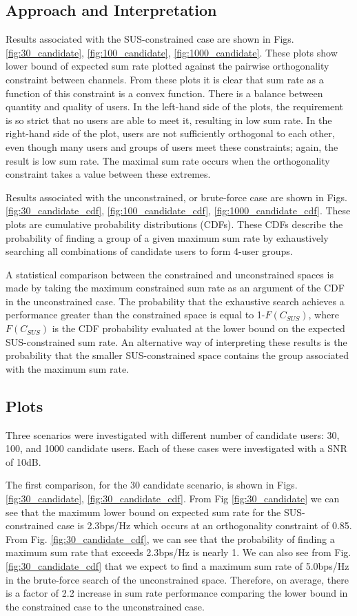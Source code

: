 \subsection{Approach and Interpretation}
Results associated with the SUS-constrained case are shown in Figs. \ref{fig:30_candidate}, \ref{fig:100_candidate}, \ref{fig:1000_candidate}. These plots show lower bound of expected sum rate plotted against the pairwise orthogonality constraint between channels. From these plots it is clear that sum rate as a function of this constraint is a convex function. There is a balance between quantity and quality of users. In the left-hand side of the plots, the requirement is so strict that no users are able to meet it, resulting in low sum rate. In the right-hand side of the plot, users are not sufficiently orthogonal to each other, even though many users and groups of users meet these constraints; again, the result is low sum rate. The maximal sum rate occurs when the orthogonality constraint takes a value between these extremes.

Results associated with the unconstrained, or brute-force case are shown in Figs. \ref{fig:30_candidate_cdf}, \ref{fig:100_candidate_cdf}, \ref{fig:1000_candidate_cdf}. These plots are cumulative probability distributions (CDFs). These CDFs describe the probability of finding a group of a given maximum sum rate by exhaustively searching all combinations of candidate users to form 4-user groups.

A statistical comparison between the constrained and unconstrained spaces is made by taking the maximum constrained sum rate as an argument of the CDF in the unconstrained case. The probability that the exhaustive search achieves a performance greater than the constrained space is equal to 1-$F(C_{SUS})$, where $F(C_{SUS})$ is the CDF probability evaluated at the lower bound on the expected SUS-constrained sum rate. An alternative way of interpreting these results is the probability that the smaller SUS-constrained space contains the group associated with the maximum sum rate.

\subsection{Plots}

Three scenarios were investigated with different number of candidate users: 30, 100, and 1000 candidate users. Each of these cases were investigated with a SNR of 10dB.

The first comparison, for the 30 candidate scenario, is shown in Figs. \ref{fig:30_candidate}, \ref{fig:30_candidate_cdf}. From Fig \ref{fig:30_candidate} we can see that the maximum lower bound on expected sum rate for the SUS-constrained case is 2.3bps/Hz which occurs at an orthogonality constraint of 0.85. From Fig. \ref{fig:30_candidate_cdf}, we can see that the probability of finding a maximum sum rate that exceeds 2.3bps/Hz is nearly 1. We can also see from Fig. \ref{fig:30_candidate_cdf} that we expect to find a maximum sum rate of 5.0bps/Hz in the brute-force search of the unconstrained space. Therefore, on average, there is a factor of 2.2 increase in sum rate performance comparing the lower bound in the constrained case to the unconstrained case.

